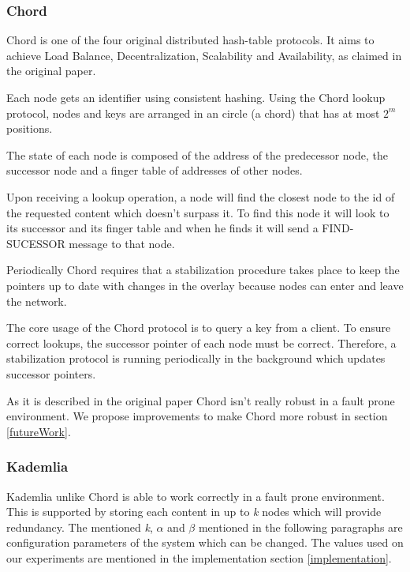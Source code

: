\documentclass[sigconf]{acmart}
\begin{document}

\subsubsection{Chord}
Chord is one of the four original distributed hash-table protocols. It aims to achieve Load Balance, Decentralization, Scalability and Availability, as claimed in the original paper.

Each node gets an identifier using consistent hashing. Using the Chord lookup protocol, nodes and keys are arranged in an circle (a chord) that has at most $2^m$ positions. 

The state of each node is composed of the address of the predecessor node, the successor node and a finger table of addresses of other nodes.

Upon receiving a lookup operation, a node will find the closest node to the id of the requested content which doesn't surpass it. To find this node it will look to its successor and its finger table and when he finds it will send a FIND-SUCESSOR message to that node.

Periodically Chord requires that a stabilization procedure takes place to keep the pointers up to date with changes in the overlay because nodes can enter and leave the network.



The core usage of the Chord protocol is to query a key from a client. To ensure correct lookups, the successor pointer of each node must be correct. Therefore, a stabilization protocol is running periodically in the background which updates successor pointers.


As it is described in the original paper Chord isn't really robust in a fault prone environment. We propose improvements to make Chord more robust in section \ref{futureWork}.

\subsubsection{Kademlia}
Kademlia unlike Chord is able to work correctly in a fault prone environment. This is supported by storing each content in up to \emph{k} nodes which will provide redundancy. The mentioned \emph{k}, $\alpha$ and $\beta$ mentioned in the following paragraphs are configuration parameters of the system which can be changed. The values used on our experiments are mentioned in the implementation section \ref{implementation}.
\end{document}
